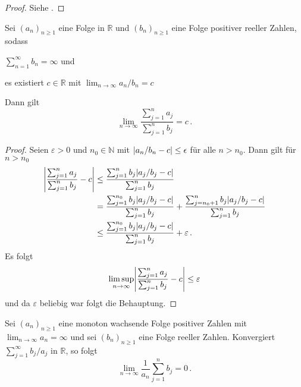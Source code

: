 \documentclass[ngerman,a4paper,11pt]{scrartcl}
\newcommand{\NN}{\mathbb{N}}
\newcommand{\RR}{\mathbb{R}}
\DeclarePairedDelimiter{\abs}{\lvert}{\rvert}		%
\begin{document}
\begin{proof}
 Siehe \cite[Satz~5.31 und Bemerkung~5.32(a)]{lpw}.
\end{proof}
\begin{lem}
 Sei $(a_n)_{n\geq 1}$ eine Folge in $\RR$ und $(b_n)_{n\geq 1}$ eine Folge positiver reeller Zahlen, sodass 
 \begin{thmasslist}
 \item 
     $\sum_{n=1}^\infty b_n=\infty$ und
 \item es existiert $c\in\RR$ mit $\lim_{n\to\infty}a_n/b_n=c$
 \end{thmasslist}
 Dann gilt
 \begin{equation*}
  \lim_{n\to\infty} \frac{\sum_{j=1}^na_j}{\sum_{j=1}^nb_j}=c\,.
 \end{equation*}
\end{lem}
\begin{proof}
 Seien $\varepsilon >0$ und $n_0\in\NN$ mit $\abs{a_n/b_n-c}\leq\epsilon$
 für alle $n>n_0$. Dann gilt für $n>n_0$
 \begin{align*}
  \abs*{\frac{\sum_{j=1}^na_j}{\sum_{j=1}^nb_j}-c}&\leq\frac{\sum_{j=1}^nb_j\abs{a_j/b_j-c}}{\sum_{j=1}^nb_j} \\
&=\frac{\sum_{j=1}^{n_0}b_j\abs{a_j/b_j-c}}{\sum_{j=1}^nb_j}+\frac{\sum_{j=n_0+1}^nb_j\abs{a_j/b_j-c}}{\sum_{j=1}^nb_j} \\
&\leq\frac{\sum_{j=1}^{n_0}b_j\abs{a_j/b_j-c}}{\sum_{j=1}^nb_j}+\varepsilon\,.
 \end{align*}
Es folgt
\begin{equation*}
  \limsup_{n\to\infty} \abs*{\frac{\sum_{j=1}^na_j}{\sum_{j=1}^nb_j}-c}\leq\varepsilon
\end{equation*}
und da $\varepsilon$ beliebig war folgt die Behauptung.
\end{proof}
\begin{lem}
 Sei $(a_n)_{n\geq 1}$ eine monoton wachsende Folge positiver Zahlen mit
 $\lim_{n\to\infty}a_n=\infty$ und sei $(b_n)_{n\geq 1}$ eine Folge reeller
 Zahlen. Konvergiert $\sum_{j=1}^\infty b_j/a_j$ in $\RR$, so folgt
 \begin{equation*}
  \lim_{n\to\infty} \frac{1}{a_n}\sum_{j=1}^nb_j=0\,.
 \end{equation*}
\end{lem}
\end{document}
